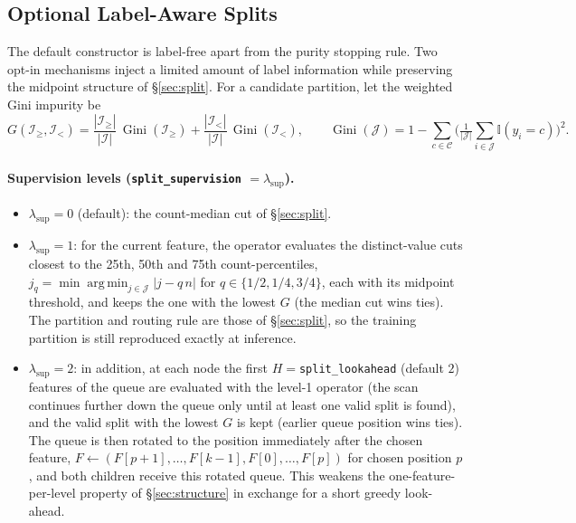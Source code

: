 \documentclass[11pt,a4paper]{article}
\newcommand{\code}[1]{\texttt{#1}}
\newcommand{\Ind}{\mathbb{I}}
\DeclareMathOperator*{\argmin}{arg\,min}
\DeclareMathOperator{\Gini}{Gini}
\begin{document}
\subsection{Optional Label-Aware Splits}
\label{sec:labelaware}

The default constructor is label-free apart from the purity stopping rule. Two opt-in mechanisms inject a limited amount of label information while preserving the midpoint structure of \S\ref{sec:split}. For a candidate partition, let the weighted Gini impurity be
\begin{equation}
  G(\mathcal{I}_{\ge}, \mathcal{I}_{<}) = \frac{|\mathcal{I}_{\ge}|}{|\mathcal{I}|}\,\Gini(\mathcal{I}_{\ge}) + \frac{|\mathcal{I}_{<}|}{|\mathcal{I}|}\,\Gini(\mathcal{I}_{<}),
  \qquad
  \Gini(\mathcal{J}) = 1 - \sum_{c \in \mathcal{C}} \Big(\tfrac{1}{|\mathcal{J}|} \textstyle\sum_{i \in \mathcal{J}} \Ind(y_i = c)\Big)^2.
\end{equation}

\paragraph{Supervision levels (\code{split\_supervision} $= \lambda_{\text{sup}}$).}
\begin{itemize}[leftmargin=*, itemsep=3pt]
  \item $\lambda_{\text{sup}} = 0$ (default): the count-median cut of \S\ref{sec:split}.
  \item $\lambda_{\text{sup}} = 1$: for the current feature, the operator evaluates the distinct-value cuts closest to the 25th, 50th and 75th count-percentiles, $j_q = \min \argmin_{j \in \mathcal{J}} |j - q\,n|$ for $q \in \{1/2, 1/4, 3/4\}$, each with its midpoint threshold, and keeps the one with the lowest $G$ (the median cut wins ties). The partition and routing rule are those of \S\ref{sec:split}, so the training partition is still reproduced exactly at inference.
  \item $\lambda_{\text{sup}} = 2$: in addition, at each node the first $H = {}$\code{split\_lookahead} (default $2$) features of the queue are evaluated with the level-1 operator (the scan continues further down the queue only until at least one valid split is found), and the valid split with the lowest $G$ is kept (earlier queue position wins ties). The queue is then rotated to the position immediately after the chosen feature, $F \gets (F[p+1], \dots, F[k-1], F[0], \dots, F[p])$ for chosen position $p$, and both children receive this rotated queue. This weakens the one-feature-per-level property of \S\ref{sec:structure} in exchange for a short greedy look-ahead.
\end{itemize}
\end{document}
